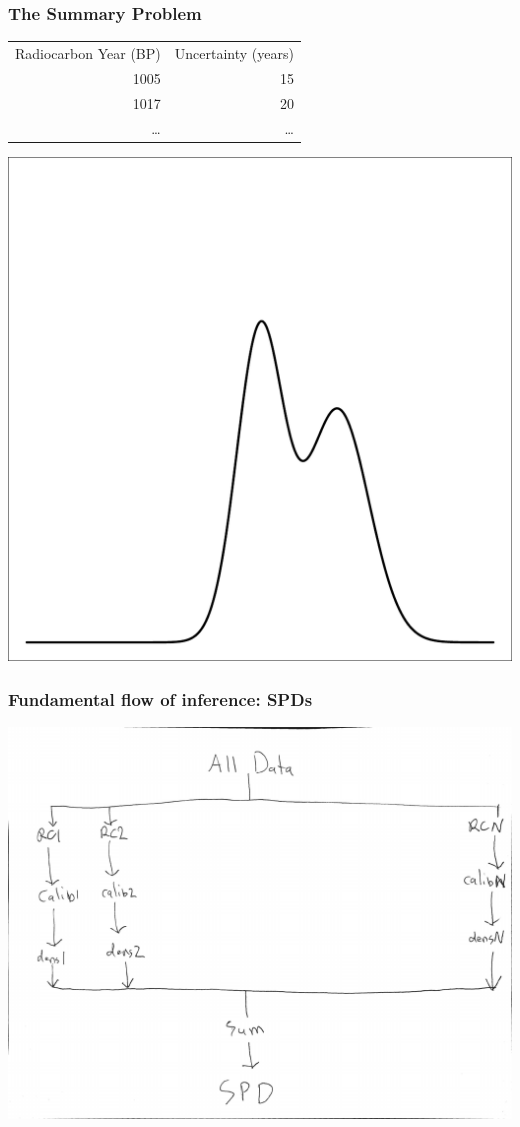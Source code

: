 \documentclass{beamer}
\begin{document}
\begin{frame}[t]
  \frametitle{The Summary Problem}
\begin{center}
	\begin{tabular}{ r r }
		Radiocarbon Year (BP) & Uncertainty (years)\\
		1005 & 15\\
		1017 & 20\\
		\ldots & \ldots\\
	\end{tabular}
	\includegraphics[width=.5\textwidth]{bayesian_update_illustration_th2.pdf}\\
\end{center}
\end{frame}

\begin{frame}[t]
  \frametitle{Fundamental flow of inference: SPDs}
    \includegraphics[height=.85\textheight]{spd_flow.pdf}
\end{frame}
\end{document}
